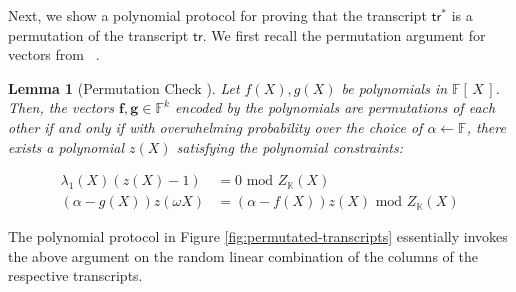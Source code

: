 \documentclass[sigconf]{acmart}
\newtheorem{lemma}{Lemma}[section]
\renewcommand{\vec}{\mathbf} %
\newcommand{\setH}{\mathbb{K}}
\newcommand{\F}{\mathbb{F}}
\newcommand{\tr}{\ensuremath{\mathsf{tr}}}
\providecommand{\DIFaddbegin}{} %
\providecommand{\DIFaddend}{} %
\providecommand{\DIFdelbegin}{} %
\providecommand{\DIFdelend}{} %
\newcommand{\DIFscaledelfig}{0.5}
\newlength{\DIFdelgraphicswidth} %
\newlength{\DIFdelgraphicsheight} %
\newcommand{\DIFaddincludegraphics}[2][]{{\color{blue}\fbox{\DIFOincludegraphics[#1]{#2}}}} %
\newcommand{\DIFdelincludegraphics}[2][]{%
	\sbox{\DIFdelgraphicsbox}{\DIFOincludegraphics[#1]{#2}}%
	\settoboxwidth{\DIFdelgraphicswidth}{\DIFdelgraphicsbox} %
	\settoboxtotalheight{\DIFdelgraphicsheight}{\DIFdelgraphicsbox} %
	\scalebox{\DIFscaledelfig}{%
		\parbox[b]{\DIFdelgraphicswidth}{\usebox{\DIFdelgraphicsbox}\\[-\baselineskip] \rule{\DIFdelgraphicswidth}{0em}}\llap{\resizebox{\DIFdelgraphicswidth}{\DIFdelgraphicsheight}{%
				\setlength{\unitlength}{\DIFdelgraphicswidth}%
				\begin{picture}(1,1)%
					\thicklines\linethickness{2pt} %
					{\color[rgb]{1,0,0}\put(0,0){\framebox(1,1){}}}%
					{\color[rgb]{1,0,0}\put(0,0){\line( 1,1){1}}}%
					{\color[rgb]{1,0,0}\put(0,1){\line(1,-1){1}}}%
				\end{picture}%
			}\hspace*{3pt}}} %
} %
\DeclareRobustCommand{\DIFaddbegin}{\DIFOaddbegin \let\includegraphics\DIFaddincludegraphics} %
\DeclareRobustCommand{\DIFaddend}{\DIFOaddend \let\includegraphics\DIFOincludegraphics} %
\DeclareRobustCommand{\DIFdelbegin}{\DIFOdelbegin \let\includegraphics\DIFdelincludegraphics} %
\DeclareRobustCommand{\DIFdelend}{\DIFOaddend \let\includegraphics\DIFOincludegraphics} %
\begin{document}
	Next, we show a polynomial protocol for proving that the transcript $\tr^\ast$ is a permutation of the transcript $\tr$.
	We first recall the permutation argument for vectors from ~\cite{EPRINT:GabWilCio19}.
	\begin{lemma}[Permutation Check \cite{EPRINT:GabWilCio19}]\label{lem:perm-argument}
		Let $f(X), g(X)$ be polynomials in $\F[\,X\,]$. Then, the vectors $\vec{f}, \vec{g}\in \F^k$ encoded by the polynomials
		are permutations of each other if and only if with overwhelming probability over the choice of $\alpha\gets \F$,
		there exists a polynomial $z(X)$ satisfying the polynomial constraints:
		\DIFdelbegin %
		\DIFdelend \DIFaddbegin 
		
		\DIFaddend \begin{align}
			\lambda_1(X)(z(X) -1) &= 0 \text{ mod } Z_\setH(X) \tag{B1} \label{eq:B1} \\
			(\alpha - g(X))z(\omega X) &= (\alpha - f(X))z(X) \text{ mod } Z_\setH(X) \tag{B2} \label{eq:B2}
		\end{align}
		\DIFdelbegin %
		\DIFdelend \DIFaddbegin 
		
		\DIFaddend \end{lemma}
	The polynomial protocol in Figure \ref{fig:permutated-transcripts} essentially invokes the above argument on
	the random linear combination of the columns of the respective transcripts.
\end{document}
